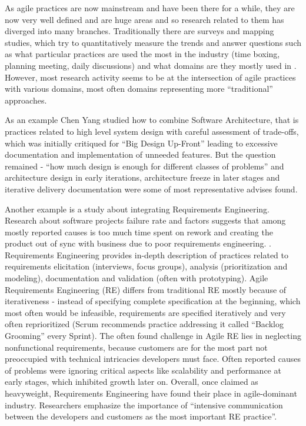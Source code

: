 \documentclass{article}
\begin{document}
As agile practices are now mainstream and have been there for a while, they are now very well defined and are huge areas and so research related to them has diverged into many branches. Traditionally there are surveys and mapping studies, which try to quantitatively measure the trends and answer questions such as what particular practices are used the most in the industry (time boxing, planning meeting, daily discussions) and what domains are they mostly used in \cite{diebold2014agile}. However, most research activity seems to be at the intersection of agile practices with various domains, most often domains representing more ``traditional'' approaches.

As an example Chen Yang \cite{yang2016systematic} studied how to combine Software Architecture, that is practices related to high level system design with careful assessment of trade-offs, which was initially critiqued for ``Big Design Up-Front'' leading to excessive documentation and implementation of unneeded features. But the question remained - ``how much design is enough for different classes of problems'' and architecture design in early iterations, architecture freeze in later stages and iterative delivery documentation were some of most representative advises found.

Another example is a study about integrating Requirements Engineering. Research about software projects failure rate and factors suggests that among mostly reported causes is too much time spent on rework and creating the product out of sync with business due to poor requirements engineering. \cite{arcidiacono2017comparative}. Requirements Engineering provides in-depth description of practices related to requirements elicitation (interviews, focus groups), analysis (prioritization and modeling), documentation and validation (often with prototyping). Agile Requirements Engineering (RE) differs from traditional RE mostly because of iterativeness - instead of specifying complete specification at the beginning, which most often would be infeasible, requirements are specified iteratively and very often reprioritized (Scrum recommends practice addressing it called ``Backlog Grooming'' every Sprint\cite{rubin2012essential}). The often found challenge in Agile RE lies in neglecting nonfunctional requirements, because customers are for the most part not preoccupied with technical intricacies developers must face. Often reported causes of problems were ignoring critical aspects like scalability and performance at early stages, which inhibited growth later on. Overall, once claimed as heavyweight, Requirements Engineering have found their place in agile-dominant industry. Researchers emphasize the importance of ``intensive communication between the developers and customers as the most important RE practice''. \cite{paetsch2003requirements} \cite{cao2008agile} 
\end{document}
